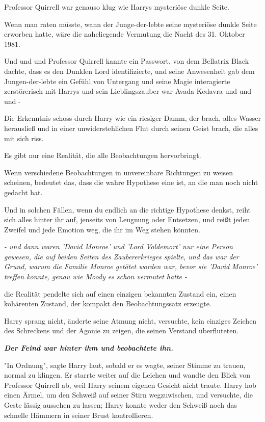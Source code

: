 {{Professor Quirrell war genauso klug wie Harrys mysteriöse dunkle Seite.

Wenn man raten müsste, wann der Junge-der-lebte seine mysteriöse dunkle Seite erworben hatte, wäre die naheliegende Vermutung die Nacht des 31. Oktober 1981.}

Und und und Professor Quirrell kannte ein Passwort, von dem Bellatrix Black dachte, dass es den Dunklen Lord identifizierte, und seine Anwesenheit gab dem Jungen-der-lebte ein Gefühl von Untergang und seine Magie interagierte zerstörerisch mit Harrys und sein Lieblingszauber war Avada Kedavra und und und -

Die Erkenntnis schoss durch Harry wie ein riesiger Damm, der brach, alles Wasser herausließ und in einer unwiderstehlichen Flut durch seinen Geist brach, die alles mit sich riss.

Es gibt nur eine Realität, die alle Beobachtungen hervorbringt.

Wenn verschiedene Beobachtungen in unvereinbare Richtungen zu weisen scheinen, bedeutet das, dass die wahre Hypothese eine ist, an die man noch nicht gedacht hat.

Und in solchen Fällen, wenn du endlich an die richtige Hypothese denkst, reiht sich alles hinter ihr auf, jenseits von Leugnung oder Entsetzen, und reißt jeden Zweifel und jede Emotion weg, die ihr im Weg stehen könnten.

\emph{- und dann waren 'David Monroe' und 'Lord Voldemort' nur eine Person gewesen, die auf beiden Seiten des Zaubererkrieges spielte, und das war der Grund, warum die Familie Monroe getötet worden war, bevor sie 'David Monroe' treffen konnte, genau wie Moody es schon vermutet hatte -}

die Realität pendelte sich auf einen einzigen bekannten Zustand ein, einen kohärenten Zustand, der kompakt den Beobachtungssatz erzeugte.

Harry sprang nicht, änderte seine Atmung nicht, versuchte, kein einziges Zeichen des Schreckens und der Agonie zu zeigen, die seinen Verstand überfluteten.

\textbf{\emph{Der Feind war hinter ihm und beobachtete ihn.}}

"In Ordnung", sagte Harry laut, sobald er es wagte, seiner Stimme zu trauen, normal zu klingen. Er starrte weiter auf die Leichen und wandte den Blick von Professor Quirrell ab, weil Harry seinem eigenen Gesicht nicht traute. Harry hob einen Ärmel, um den Schweiß auf seiner Stirn wegzuwischen, und versuchte, die Geste lässig aussehen zu lassen; Harry konnte weder den Schweiß noch das schnelle Hämmern in seiner Brust kontrollieren.

}
